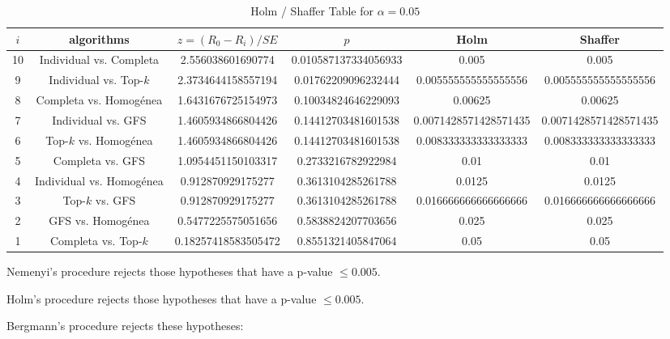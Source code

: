 \documentclass[a4paper,10pt]{article}
\begin{document}
\begin{landscape}
\begin{table}[!htp]
\centering\tiny
\caption{Holm / Shaffer Table for $\alpha=0.05$}
\begin{tabular}{cccccc}
$i$&algorithms&$z=(R_0 - R_i)/SE$&$p$&Holm&Shaffer\\
\hline
10&Individual vs. Completa&2.556038601690774&0.010587137334056933&0.005&0.005\\
9&Individual vs. Top-$k$&2.3734644158557194&0.01762209096232444&0.005555555555555556&0.005555555555555556\\
8&Completa vs. Homogénea&1.6431676725154973&0.10034824646229093&0.00625&0.00625\\
7&Individual vs. GFS&1.4605934866804426&0.14412703481601538&0.0071428571428571435&0.0071428571428571435\\
6&Top-$k$ vs. Homogénea&1.4605934866804426&0.14412703481601538&0.008333333333333333&0.008333333333333333\\
5&Completa vs. GFS&1.0954451150103317&0.2733216782922984&0.01&0.01\\
4&Individual vs. Homogénea&0.912870929175277&0.3613104285261788&0.0125&0.0125\\
3&Top-$k$ vs. GFS&0.912870929175277&0.3613104285261788&0.016666666666666666&0.016666666666666666\\
2&GFS vs. Homogénea&0.5477225575051656&0.5838824207703656&0.025&0.025\\
1&Completa vs. Top-$k$&0.18257418583505472&0.8551321405847064&0.05&0.05\\
\hline
\end{tabular}
\end{table}
Nemenyi's procedure rejects those hypotheses that have a p-value $\le0.005$.


Holm's procedure rejects those hypotheses that have a p-value $\le0.005$.


Bergmann's procedure rejects these hypotheses:


\begin{itemize}


\end{itemize}



\end{landscape}
\end{document}
